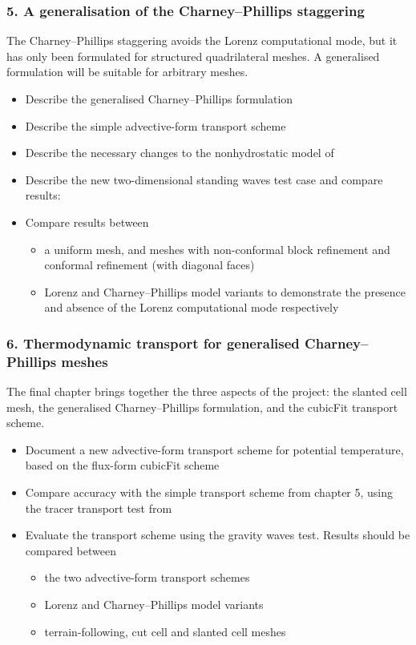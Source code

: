 \documentclass[a4paper,11pt]{article}
\begin{document}
\subsubsection*{5. A generalisation of the Charney--Phillips staggering}
\noindent The Charney--Phillips staggering avoids the Lorenz computational mode, but it has only been formulated for structured quadrilateral meshes.  A generalised formulation will be suitable for arbitrary meshes.
\begin{itemize}[itemsep=0.1em]
	\item Describe the generalised Charney--Phillips formulation
	\item Describe the simple advective-form transport scheme
	\item Describe the necessary changes to the nonhydrostatic model of \citet{weller-shahrokhi2014}
	\item Describe the new two-dimensional standing waves test case and compare results:
	\item Compare results between
	\begin{itemize}
		\item a uniform mesh, and meshes with non-conformal block refinement and conformal refinement (with diagonal faces)
		\item Lorenz and Charney--Phillips model variants to demonstrate the presence and absence of the Lorenz computational mode respectively
	\end{itemize}
\end{itemize}

\subsubsection*{6. Thermodynamic transport for generalised Charney--Phillips meshes}
\noindent The final chapter brings together the three aspects of the project: the slanted cell mesh, the generalised Charney--Phillips formulation, and the cubicFit transport scheme.
\begin{itemize}
	\item Document a new advective-form transport scheme for potential temperature, based on the flux-form cubicFit scheme
	\item Compare accuracy with the simple transport scheme from chapter 5, using the tracer transport test from \citep{shaw2017}
	\item Evaluate the transport scheme using the \citet{schaer2002} gravity waves test.  Results should be compared between
	\begin{itemize}
		\item the two advective-form transport schemes
		\item Lorenz and Charney--Phillips model variants
		\item terrain-following, cut cell and slanted cell meshes
	\end{itemize}
\end{itemize}
\end{document}
